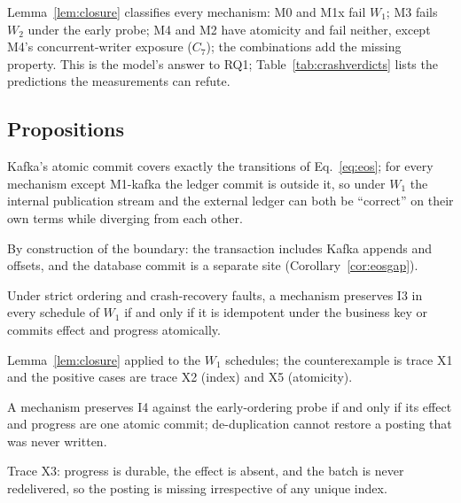 Lemma~\ref{lem:closure} classifies every mechanism: M0 and M1x fail $W_1$; M3 fails $W_2$ under
the early probe; M4 and M2 have atomicity and fail neither, except M4's concurrent-writer
exposure ($C_7$); the combinations add the missing property. This is the model's answer to RQ1;
Table~\ref{tab:crashverdicts} lists the predictions the measurements can refute.

\subsection{Propositions}
\label{sec:formal:props}

\begin{proposition}
\label{prop:p1}
Kafka's atomic commit covers exactly the transitions of Eq.~\eqref{eq:eos}; for every mechanism
except M1-kafka the ledger commit is outside it, so under $W_1$ the internal publication stream
and the external ledger can both be ``correct'' on their own terms while diverging from each
other.
\end{proposition}
\begin{proofsketch}
By construction of the boundary: the transaction includes Kafka appends and offsets, and the
database commit is a separate site (Corollary~\ref{cor:eosgap}).
\end{proofsketch}

\begin{proposition}[$W_1$ closure]
\label{prop:p2}
Under strict ordering and crash-recovery faults, a mechanism preserves I3 in every schedule of
$W_1$ if and only if it is idempotent under the business key or commits effect and progress
atomically.
\end{proposition}
\begin{proofsketch}
Lemma~\ref{lem:closure} applied to the $W_1$ schedules; the counterexample is trace X1 and the
positive cases are trace X2 (index) and X5 (atomicity).
\end{proofsketch}

\begin{proposition}[$W_2$ closure]
\label{prop:p3}
A mechanism preserves I4 against the early-ordering probe if and only if its effect and
progress are one atomic commit; de-duplication cannot restore a posting that was never written.
\end{proposition}
\begin{proofsketch}
Trace X3: progress is durable, the effect is absent, and the batch is never redelivered, so the
posting is missing irrespective of any unique index.
\end{proofsketch}


